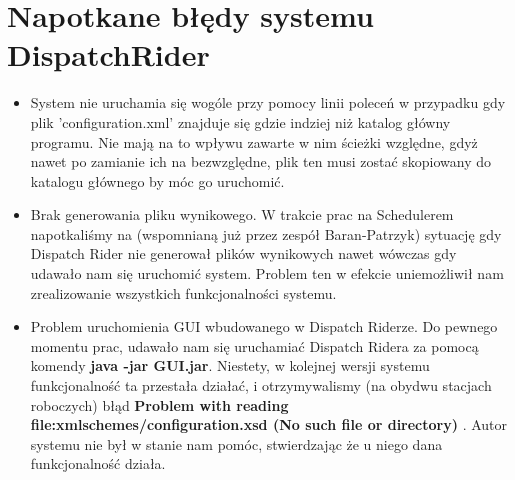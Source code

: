 \section{Napotkane błędy systemu DispatchRider}
\begin{itemize}
	\item System nie uruchamia się wogóle przy pomocy linii poleceń w przypadku gdy plik 'configuration.xml' znajduje się gdzie indziej niż katalog główny programu. Nie mają na to wpływu zawarte w nim ścieżki względne, gdyż nawet po zamianie ich na bezwzględne, plik ten musi zostać skopiowany do katalogu głównego by móc go uruchomić.
	\item Brak generowania pliku wynikowego. W trakcie prac na Schedulerem napotkaliśmy na (wspomnianą już przez zespół Baran-Patrzyk) sytuację gdy Dispatch Rider nie generował plików wynikowych nawet wówczas gdy udawało nam się uruchomić system. Problem ten w efekcie uniemożliwił nam zrealizowanie wszystkich funkcjonalności systemu.
	\item Problem uruchomienia GUI wbudowanego w Dispatch Riderze. Do pewnego momentu prac, udawało nam się uruchamiać Dispatch Ridera za pomocą komendy \textbf{java -jar GUI.jar}. Niestety, w kolejnej wersji systemu funkcjonalność ta przestała działać, i otrzymywalismy  (na obydwu stacjach roboczych) błąd \textbf{Problem with reading file:xmlschemes/configuration.xsd (No such file or directory) }. Autor systemu nie był w stanie nam pomóc, stwierdzając że u niego dana funkcjonalność działa.
\end{itemize}